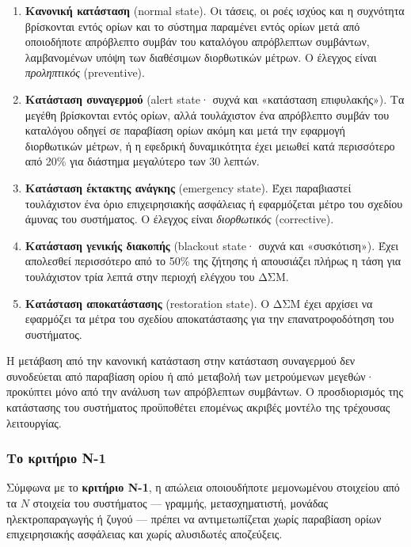 \begin{enumerate}
\item \textbf{Κανονική κατάσταση} (normal state). Οι τάσεις, οι ροές ισχύος και η συχνότητα
      βρίσκονται εντός ορίων και το σύστημα παραμένει εντός ορίων μετά από οποιοδήποτε
      απρόβλεπτο συμβάν του καταλόγου απρόβλεπτων συμβάντων, λαμβανομένων υπόψη των
      διαθέσιμων διορθωτικών μέτρων. Ο έλεγχος είναι \emph{προληπτικός} (preventive).
\item \textbf{Κατάσταση συναγερμού} (alert state· συχνά και «κατάσταση επιφυλακής»). Τα
      μεγέθη βρίσκονται εντός ορίων, αλλά τουλάχιστον ένα απρόβλεπτο συμβάν του καταλόγου
      οδηγεί σε παραβίαση ορίων ακόμη και μετά την εφαρμογή διορθωτικών μέτρων, ή η
      εφεδρική δυναμικότητα έχει μειωθεί κατά περισσότερο από 20\% για διάστημα
      μεγαλύτερο των 30 λεπτών.
\item \textbf{Κατάσταση έκτακτης ανάγκης} (emergency state). Έχει παραβιαστεί τουλάχιστον
      ένα όριο επιχειρησιακής ασφάλειας ή εφαρμόζεται μέτρο του σχεδίου άμυνας του
      συστήματος. Ο έλεγχος είναι \emph{διορθωτικός} (corrective).
\item \textbf{Κατάσταση γενικής διακοπής} (blackout state· συχνά και «συσκότιση»). Έχει
      απολεσθεί περισσότερο από το 50\% της ζήτησης ή απουσιάζει πλήρως η τάση για
      τουλάχιστον τρία λεπτά στην περιοχή ελέγχου του ΔΣΜ.
\item \textbf{Κατάσταση αποκατάστασης} (restoration state). Ο ΔΣΜ έχει αρχίσει να
      εφαρμόζει τα μέτρα του σχεδίου αποκατάστασης για την επανατροφοδότηση του
      συστήματος.
\end{enumerate}

Η μετάβαση από την κανονική κατάσταση στην κατάσταση συναγερμού δεν συνοδεύεται από
παραβίαση ορίου ή από μεταβολή των μετρούμενων μεγεθών· προκύπτει μόνο από την ανάλυση
των απρόβλεπτων συμβάντων. Ο προσδιορισμός της κατάστασης του συστήματος προϋποθέτει
επομένως ακριβές μοντέλο της τρέχουσας λειτουργίας.

\subsubsection*{Το κριτήριο N-1}

Σύμφωνα με το \textbf{κριτήριο N-1}, η απώλεια οποιουδήποτε μεμονωμένου στοιχείου από τα $N$
στοιχεία του συστήματος — γραμμής, μετασχηματιστή, μονάδας ηλεκτροπαραγωγής ή ζυγού —
πρέπει να αντιμετωπίζεται χωρίς παραβίαση ορίων επιχειρησιακής ασφάλειας και χωρίς
αλυσιδωτές αποζεύξεις.

